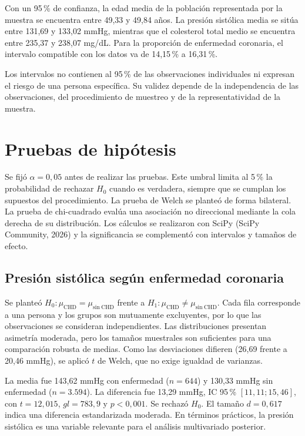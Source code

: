 \documentclass[10pt,a4paper]{article}
\begin{document}
Con un 95\,\% de confianza, la edad media de la población representada por la muestra se encuentra entre 49,33 y 49,84 años. La presión sistólica media se sitúa entre 131,69 y 133,02 mmHg, mientras que el colesterol total medio se encuentra entre 235,37 y 238,07 mg/dL. Para la proporción de enfermedad coronaria, el intervalo compatible con los datos va de 14,15\,\% a 16,31\,\%.

Los intervalos no contienen al 95\,\% de las observaciones individuales ni expresan el riesgo de una persona específica. Su validez depende de la independencia de las observaciones, del procedimiento de muestreo y de la representatividad de la muestra.

\section{Pruebas de hipótesis}

Se fijó $\alpha=0,05$ antes de realizar las pruebas. Este umbral limita al 5\,\% la probabilidad de rechazar $H_0$ cuando es verdadera, siempre que se cumplan los supuestos del procedimiento. La prueba de Welch se planteó de forma bilateral. La prueba de chi-cuadrado evalúa una asociación no direccional mediante la cola derecha de su distribución. Los cálculos se realizaron con SciPy (SciPy Community, 2026) y la significancia se complementó con intervalos y tamaños de efecto.

\subsection{Presión sistólica según enfermedad coronaria}

Se planteó $H_0:\mu_{\mathrm{CHD}}=\mu_{\mathrm{sin\ CHD}}$ frente a $H_1:\mu_{\mathrm{CHD}}\neq\mu_{\mathrm{sin\ CHD}}$. Cada fila corresponde a una persona y los grupos son mutuamente excluyentes, por lo que las observaciones se consideran independientes. Las distribuciones presentan asimetría moderada, pero los tamaños muestrales son suficientes para una comparación robusta de medias. Como las desviaciones difieren (26,69 frente a 20,46 mmHg), se aplicó $t$ de Welch, que no exige igualdad de varianzas.

La media fue 143,62 mmHg con enfermedad ($n=644$) y 130,33 mmHg sin enfermedad ($n=3.594$). La diferencia fue 13,29 mmHg, IC 95\,\% $[11,11;15,46]$, con $t=12,015$, $gl=783,9$ y $p<0,001$. Se rechazó $H_0$. El tamaño $d=0,617$ indica una diferencia estandarizada moderada. En términos prácticos, la presión sistólica es una variable relevante para el análisis multivariado posterior.
\end{document}
